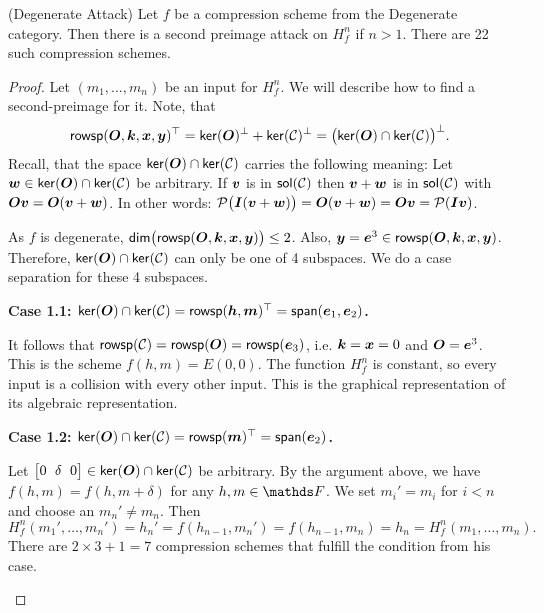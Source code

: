 \begin{lemma}(Degenerate Attack)
    Let $f$ be a compression scheme from the Degenerate category.
    Then there is a second preimage attack on $H^n_f$ if $n>1$.
    There are 22 such compression schemes.
\end{lemma}
\begin{proof}
Let $(m_1, \dots, m_n)$ be an input for $H^n_f$.
We will describe how to find a second-preimage for it.
Note, that 
\[
\mathsf{rowsp}(\boldsymbol{O}, \boldsymbol k, \boldsymbol x, \boldsymbol y)^\top = \mathsf{ker}(\boldsymbol{O})^\perp + \mathsf{ker}(\mathcal{C})^\perp = \big(\mathsf{ker}(\boldsymbol{O}) \cap \mathsf{ker}(\mathcal{C})\big)^\perp.
\] 
Recall, that the space $\mathsf{ker}(\boldsymbol{O}) \cap \mathsf{ker}(\mathcal{C})$ carries the following meaning:
Let $\boldsymbol w \in \mathsf{ker}(\boldsymbol{O}) \cap \mathsf{ker}(\mathcal{C})$ be arbitrary.
If $\boldsymbol v$ is in $\mathsf{sol}(\mathcal{C})$ then $\boldsymbol v + \boldsymbol w$ is in $\mathsf{sol}(\mathcal{C})$ with $\boldsymbol{O}\boldsymbol v = \boldsymbol{O}(\boldsymbol v + \boldsymbol w)$.
In other words: $\mathcal{P}\big(\boldsymbol{I}(\boldsymbol v + \boldsymbol w)\big) = \boldsymbol{O}(\boldsymbol v + \boldsymbol w) = \boldsymbol{O}\boldsymbol v = \mathcal{P}(\boldsymbol{I}\boldsymbol v)$.

As $f$ is degenerate, $\mathsf{dim}\big(\mathsf{rowsp}(\boldsymbol{O},\boldsymbol k,\boldsymbol x,\boldsymbol y)\big) \leq 2$.
Also, $\boldsymbol y = \boldsymbol e^3 \in \mathsf{rowsp}(\boldsymbol{O}, \boldsymbol k, \boldsymbol x, \boldsymbol y)$.
Therefore, $\mathsf{ker}(\boldsymbol{O}) \cap \mathsf{ker}(\mathcal{C})$ can only be one of 4 subspaces.
We do a case separation for these 4 subspaces.

\textbf{Case 1.1: $\mathsf{ker}(\boldsymbol{O}) \cap \mathsf{ker}(\mathcal{C}) = \mathsf{rowsp}(\boldsymbol h, \boldsymbol m)^\top = \mathsf{span}(\boldsymbol e_1, \boldsymbol e_2)$.}

It follows that $\mathsf{rowsp}(\mathcal{C}) = \mathsf{rowsp}(\boldsymbol{O}) = \mathsf{rowsp}(\boldsymbol e_3)$, i.e. $\boldsymbol k = \boldsymbol x = 0$ and $\boldsymbol{O} = \boldsymbol e^3$.
This is the scheme $f(h,m) = E(0,0)$.
The function $H^n_f$ is constant, so every input is a collision with every other input.
This is the graphical representation of its algebraic representation.
\begin{center}
\centering
{}
\end{center}

\textbf{Case 1.2: $\mathsf{ker}(\boldsymbol{O}) \cap \mathsf{ker}(\mathcal{C}) = \mathsf{rowsp}(\boldsymbol m)^\top = \mathsf{span}(\boldsymbol e_2)$.}

Let $\m{0&\delta&0} \in \ker(\O) \cap \ker(\C)$ be arbitrary.
By the argument above, we have $f(h,m) = f(h,m + \delta)$ for any $h, m \in \F$.
We set $m_i' = m_i$ for $i<n$ and choose an $m_n' \neq m_n$.
Then 
\[
H^n_f(m_1', \dots, m_n') = h_n' = f(h_{n-1}, m_n') = f(h_{n-1}, m_n) = h_n = H^n_f(m_1, \dots, m_n).
\]
There are $2 \times 3 + 1 = 7$ compression schemes that fulfill the condition from his case.
\begin{center}
\end{center}


\end{proof}
